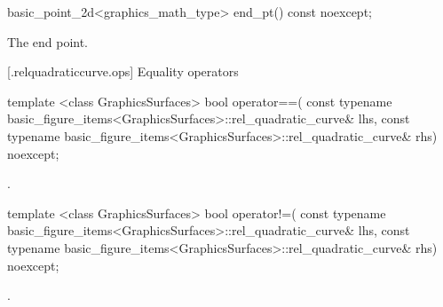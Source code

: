 %
\begin{itemdecl}
basic_point_2d<graphics_math_type> end_pt() const noexcept;
\end{itemdecl}
\begin{itemdescr}
\pnum
\returns The end point.
\end{itemdescr}

 [\iotwod.relquadraticcurve.ops] {Equality operators}%

%
\begin{itemdecl}
template <class GraphicsSurfaces>
bool operator==(
  const typename basic_figure_items<GraphicsSurfaces>::rel_quadratic_curve& lhs,
  const typename basic_figure_items<GraphicsSurfaces>::rel_quadratic_curve& rhs) 
  noexcept;
\end{itemdecl}
\begin{itemdescr}
\pnum
\returns
{}.
\end{itemdescr}

%
\begin{itemdecl}
template <class GraphicsSurfaces>
bool operator!=(
  const typename basic_figure_items<GraphicsSurfaces>::rel_quadratic_curve& lhs,
  const typename basic_figure_items<GraphicsSurfaces>::rel_quadratic_curve& rhs) 
  noexcept;
\end{itemdecl}
\begin{itemdescr}
\pnum
\returns
{}.
\end{itemdescr}
